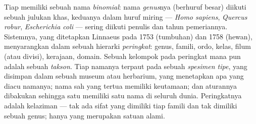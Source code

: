 \begin{definition}\label{def:b1:classifying-biodiversity:nomenclature}
Tiap  memiliki sebuah nama \emph{binomial}: nama
\emph{genus}nya (berhuruf besar) diikuti sebuah julukan khas, keduanya
dalam huruf miring --- \emph{Homo sapiens}, \emph{Quercus robur},
\emph{Escherichia coli} --- sering diikuti penulis dan tahun
pemeriannya. Sistemnya, yang ditetapkan Linnaeus pada 1753 (tumbuhan)
dan 1758 (hewan), menyarangkan  dalam sebuah hierarki
\emph{peringkat}: genus, famili, ordo, kelas, filum (atau divisi),
kerajaan, domain. Sebuah kelompok pada peringkat mana pun adalah sebuah
\emph{takson}. Tiap namanya terpaut pada sebuah \emph{spesimen tipe},
yang disimpan dalam sebuah museum atau herbarium, yang menetapkan apa
yang diacu namanya; nama sah yang tertua memiliki keutamaan; dan
aturannya dibakukan sehingga satu  memiliki satu nama di
seluruh dunia. Peringkatnya adalah kelaziman --- tak ada sifat yang
dimiliki tiap famili dan tak dimiliki sebuah genus; hanya 
yang merupakan satuan alami.
\end{definition}

